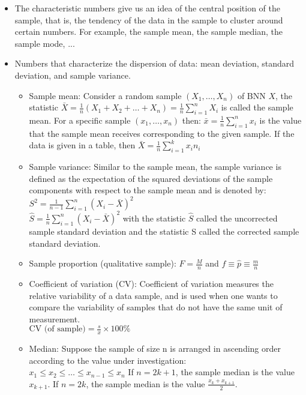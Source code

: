 \documentclass{article}
\begin{document}
\begin{itemize}
		\begin{itemize}
			\item The characteristic numbers give us an idea of the central position of the sample, that is, the tendency of the data in the sample to cluster around certain numbers. For example, the sample mean, the sample median, the sample mode, ...
			\item Numbers that characterize the dispersion of data: mean deviation, standard deviation, and sample variance.
			\begin{itemize}
				\item Sample mean: Consider a random sample \( (X_1, \ldots, X_n) \) of BNN \( X \), the statistic \( \bar{X} = \frac{1}{n} (X_1 + X_2 + \ldots + X_n) = \frac{1}{n} \sum_{i=1}^{n} X_i \) is called the sample mean. For a specific sample \( (x_1, \ldots, x_n) \) then: \(\bar{x} = \frac{1}{n} \sum_{i=1}^{n} x_i\) is the value that the sample mean receives corresponding to the given sample. If the data is given in a table, then \(\bar{X} = \frac{1}{n} \sum_{i=1}^{k} x_i n_i\)
				
				\item Sample variance: Similar to the sample mean, the sample variance is defined as the expectation of the squared deviations of the sample components with respect to the sample mean and is denoted by:
				\\
				\( S^2 = \frac{1}{n-1} \sum_{i=1}^{n} (X_i - \bar{X})^2\)
				\\
				\(\hat{S} = \frac{1}{n} \sum_{i=1}^{n} (X_i - \bar{X})^2\)
				with the statistic \( \hat{S} \) called the uncorrected sample standard deviation and the statistic S called the corrected sample standard deviation.
				
				\item Sample proportion (qualitative sample):
				\(F = \frac{M}{n}\) and \( f \equiv \hat{p} \equiv \frac{m}{n} \)
				
				\item Coefficient of variation (CV): Coefficient of variation measures the relative variability of a data sample, and is used when one wants to compare the variability of samples that do not have the same unit of measurement.
				\\
				\( \text{CV (of sample)} = \frac{s}{x} \times 100\% \)
				
				\item Median: Suppose the sample of size n is arranged in ascending order according to the value under investigation: 
				\\
				\( x_1 \le x_2 \le \ldots \le x_{n-1} \le x_n \)
				If \( n = 2k + 1 \), the sample median is the value \( x_{k+1} \). If \( n = 2k \), the sample median is the value \(\frac{x_k + x_{k+1}}{2} \).
				

\end{itemize}
\end{itemize}
\end{itemize}
\end{document}
